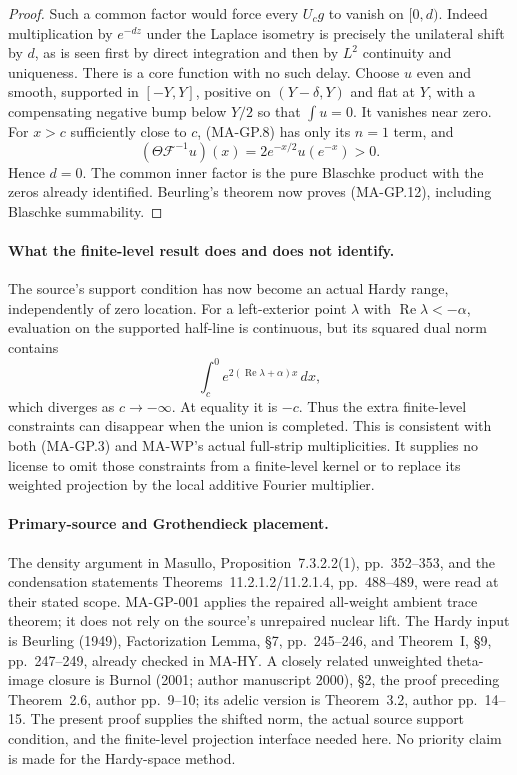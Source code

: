 \begin{proof}
Such a common factor would force every $U_cg$ to vanish
on $[0,d)$.  Indeed multiplication by $e^{-dz}$ under
the Laplace isometry is precisely the unilateral shift
by $d$, as is seen first by direct integration and then
by $L^2$ continuity and uniqueness.
There is a core function with no such delay.
Choose $u$ even and smooth, supported in $[-Y,Y]$, positive
on $(Y-\delta,Y)$ and flat at $Y$, with a compensating
negative bump below $Y/2$ so that $\int u=0$.
It vanishes near zero.  For $x>c$ sufficiently close to
$c$, (MA-GP.8) has only its $n=1$ term, and
\[
                  (\Theta\mathcal F^{-1}u)(x)
                           =2e^{-x/2}u(e^{-x})>0.
 \tag{MA-GP.18}
\]
Hence $d=0$.
The common inner factor is the pure Blaschke product
with the zeros already identified.  Beurling's theorem
now proves (MA-GP.12), including Blaschke summability.
\end{proof}

\paragraph{What the finite-level result does and does not identify.}
The source's support condition has now become an actual Hardy
range, independently of zero location.  For a left-exterior
point $\lambda$ with $\operatorname{Re}\lambda< -\alpha$,
evaluation on the supported half-line is continuous, but its
squared dual norm contains
\[
 \int_c^0e^{2(\operatorname{Re}\lambda+\alpha)x}\,dx,
 \tag{MA-GP.19}
\]
which diverges as $c\to-\infty$.  At equality it is $-c$.
Thus the extra finite-level constraints can disappear when
the union is completed.  This is consistent with both
(MA-GP.3) and MA-WP's actual full-strip multiplicities.
It supplies no license to omit those constraints from
a finite-level kernel or to replace its weighted projection
by the local additive Fourier multiplier.

\paragraph{Primary-source and Grothendieck placement.}
The density argument in Masullo, Proposition~7.3.2.2(1),
pp.~352--353, and the condensation statements
Theorems~11.2.1.2/11.2.1.4, pp.~488--489, were read at
their stated scope.  MA-GP-001 applies the repaired all-weight
ambient trace theorem; it does not rely on the source's
unrepaired nuclear lift.
The Hardy input is Beurling (1949), Factorization Lemma,
\S7, pp.~245--246, and Theorem~I, \S9, pp.~247--249,
already checked in MA-HY.  A closely related unweighted
theta-image closure is Burnol (2001; author manuscript 2000), \S2, the proof preceding
Theorem~2.6, author pp.~9--10; its adelic version is
Theorem~3.2, author pp.~14--15.  The present proof supplies
the shifted norm, the actual source support condition,
and the finite-level projection interface needed here.
No priority claim is made for the Hardy-space method.

